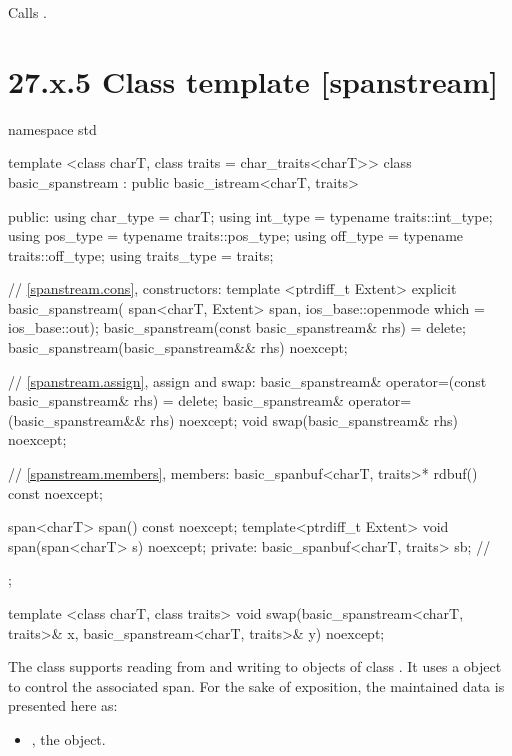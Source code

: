 \documentclass[ebook,11pt,article]{memoir}
\begin{document}
\begin{itemdescr}
\pnum
\effects
Calls
.
\end{itemdescr}

\section{27.x.5 Class template  [spanstream] }

\begin{codeblock}
namespace std {
  template <class charT, class traits = char_traits<charT>>
  class basic_spanstream
    : public basic_istream<charT, traits> {
  public:
    using char_type      = charT;
    using int_type       = typename traits::int_type;
    using pos_type       = typename traits::pos_type;
    using off_type       = typename traits::off_type;
    using traits_type    = traits;

    // \ref{spanstream.cons}, constructors:
    template <ptrdiff_t Extent>
    explicit basic_spanstream(
      span<charT, Extent> span,
      ios_base::openmode which = ios_base::out);
    basic_spanstream(const basic_spanstream& rhs) = delete;
    basic_spanstream(basic_spanstream&& rhs) noexcept;

    // \ref{spanstream.assign}, assign and swap:
    basic_spanstream& operator=(const basic_spanstream& rhs) = delete;
    basic_spanstream& operator=(basic_spanstream&& rhs) noexcept;
    void swap(basic_spanstream& rhs) noexcept;

    // \ref{spanstream.members}, members:
    basic_spanbuf<charT, traits>* rdbuf() const noexcept;

    span<charT> span() const noexcept;
	template<ptrdiff_t Extent>
    void span(span<charT> s) noexcept;
  private:
    basic_spanbuf<charT, traits> sb; // \expos
  };

  template <class charT, class traits>
    void swap(basic_spanstream<charT, traits>& x,
              basic_spanstream<charT, traits>& y) noexcept;
}
\end{codeblock}

\pnum
The class
supports reading from and writing to objects of class
.
It uses a
object to control the associated span.
For the sake of exposition, the maintained data is presented here as:
\begin{itemize}
\item
{}, the  object.
\end{itemize}
\end{document}
